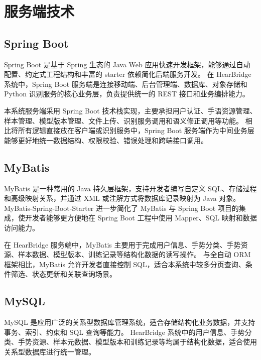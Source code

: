 
\section{服务端技术}

\subsection{Spring Boot}

Spring Boot 是基于 Spring 生态的 Java Web 应用快速开发框架，能够通过自动配置、约定式工程结构和丰富的 starter 依赖简化后端服务开发\cite{spring-boot-docs}。
在 HearBridge 系统中，Spring Boot 服务端是连接移动端、后台管理端、数据库、对象存储和 Python 识别服务的核心业务层，负责提供统一的 REST 接口和业务编排能力。

本系统服务端采用 Spring Boot 技术栈实现，主要承担用户认证、手语资源管理、样本管理、模型版本管理、文件上传、识别服务调用和语义修正调用等功能。
相比将所有逻辑直接放在客户端或识别服务中，Spring Boot 服务端作为中间业务层能够更好地统一数据结构、权限校验、错误处理和跨端接口调用。

\subsection{MyBatis}

MyBatis 是一种常用的 Java 持久层框架，支持开发者编写自定义 SQL、存储过程和高级映射关系，并通过 XML 或注解方式将数据库记录映射为 Java 对象\cite{mybatis-docs}。
MyBatis-Spring-Boot-Starter 进一步简化了 MyBatis 与 Spring Boot 项目的集成，使开发者能够更方便地在 Spring Boot 工程中使用 Mapper、SQL 映射和数据访问能力\cite{mybatis-spring-boot-starter}。

在 HearBridge 服务端中，MyBatis 主要用于完成用户信息、手势分类、手势资源、样本数据、模型版本、训练记录等结构化数据的读写操作。
与全自动 ORM 框架相比，MyBatis 允许开发者直接控制 SQL，适合本系统中较多分页查询、条件筛选、状态更新和关联查询场景。

\subsection{MySQL}

MySQL 是应用广泛的关系型数据库管理系统，适合存储结构化业务数据，并支持事务、索引、约束和 SQL 查询等能力\cite{mysql-84-docs}。
HearBridge 系统中的用户信息、手势分类、手势资源、样本元数据、模型版本和训练记录等均属于结构化数据，适合使用关系型数据库进行统一管理。

